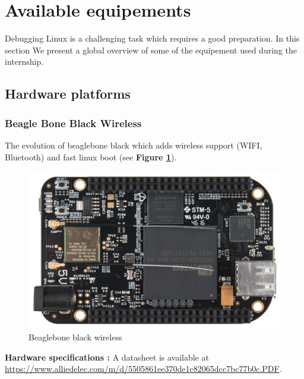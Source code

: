 \section{Available equipements}
Debugging Linux is a challenging task which requires a good preparation. In this section We present a global overview of some of the equipement used during the internship.
\subsection{Hardware platforms}


\subsubsection{Beagle Bone Black Wireless} 
The evolution of beaglebone black which adds wireless support (WIFI, Bluetooth) and fast linux boot (see \textbf{Figure \ref{Beaglebone black wireless}}). 
		\begin{figure}[H]
			\centering
        	\includegraphics[scale=0.25]{img/mean/beaglebone-black-wireless.png}
        	\caption{Beaglebone black wireless}
        	\label{Beaglebone black wireless}
    	\end{figure}
\begin{center}
\textbf{\color{red}Hardware specifications : } 
A datasheet is available at {\color{blue}\url{https://www.alliedelec.com/m/d/5505861ee370de1c82065dcc7bc77b0c.PDF}}.
\end{center}

